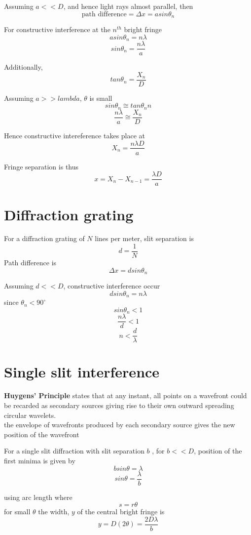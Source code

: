 \documentclass[a4paper, 10pt]{article}
\begin{document}
Assuming $a << D$, and hence light rays almost parallel, then 
\[
   \text{path difference} = \Delta x = asin \theta_n
\]

For constructive interference at the $n^{th}$ bright fringe
\[
a sin \theta_n = n \lambda
\]
\[
sin \theta_n = \frac{n\lambda}{a}
\]

Additionally,
\[
tan \theta_n = \frac{X_n}{D}
\]

Assuming \textbf{$a >> lambda$}, $\theta$ is small 
\[
   sin \theta_n \cong tan \theta_nn
\]
\[
\frac{n\lambda}{a} \cong \frac{X_n}{D}
\]

Hence constructive intereference takes place at 
\[
X_n = \frac{n \lambda D}{a}
\]

Fringe separation is thus
\[
   x = X_n - X_{n-1} = \frac{\lambda D}{a}
\]


\section{Diffraction grating}
For a diffraction grating of $N$ lines per meter, slit separation is 
\[
d = \frac{1}{N}
\]
Path difference is 
\[
\Delta x = d sin \theta_n
\]

Assuming $d << D$, constructive interference occur 
\[
d sin \theta_n = n\lambda
\]
since $\theta_n < 90^{\circ}$ 
\[
sin \theta_n < 1
\]
\[
\frac{n\lambda}{d} < 1
\]
\[
n < \frac{d}{\lambda}
\]



\section{Single slit interference}
\begin{framed}
   \textbf{Huygens' Principle} states that at any instant, all points on a wavefront could be recarded as secondary sources giving rise to their own outward spreading circular wavelets. \\

   the envelope of wavefronts produced by each secondary source gives the new position of the wavefront
\end{framed}	

For a single slit diffraction with slit separation $b$ , for $b << D$, position of the first minima is given by
\[
bsin \theta = \lambda
\]
\[
sin \theta = \frac{\lambda}{b}
\]

using arc length where \[
   s = r \theta
\]
for small $\theta$ the width, $y$  of the central bright fringe is 
\[
   y = D(2 \theta) = \frac{2D\lambda}{b}
\]
\end{document}
